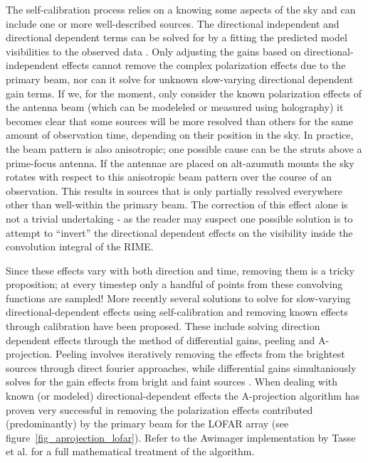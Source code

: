 The self-calibration process relies on a knowing some aspects of the sky and can include one or more well-described sources. The directional
independent and directional dependent terms can be solved for by a fitting the predicted model visibilities to the observed 
data \cite{noordam2010meqtrees}. Only adjusting the gains based on directional-independent effects cannot remove the complex 
polarization effects due to the primary beam, nor can it solve for unknown slow-varying directional dependent gain terms. If we, for 
the moment, only consider the known polarization effects of the antenna beam (which can be modeleled or measured using holography) it 
becomes clear that some sources will be more resolved than others for the same amount of observation time, 
depending on their position in the sky. In practice, the beam pattern is also anisotropic; one possible cause can be 
the struts above a prime-focus antenna. If the antennae are placed on alt-azumuth mounts the sky rotates with respect 
to this anisotropic beam pattern over the course of an observation. This results in sources that is only partially 
resolved everywhere other than well-within the primary beam. The correction of this effect alone is not a trivial undertaking - 
as the reader may suspect one possible solution is to attempt to ``invert'' the directional dependent effects on the visibility 
inside the convolution integral of the RIME.

Since these effects vary with both direction and time, removing them is a tricky proposition; at every timestep only a 
handful of points from these convolving functions are sampled! More recently several solutions to solve for slow-varying 
directional-dependent effects using self-calibration and removing known effects through calibration have been proposed. 
These include solving direction dependent effects through the method of differential gains, peeling and A-projection. Peeling 
involves iteratively removing the effects from the brightest sources through direct fourier approaches, while differential 
gains simultaniously solves for the gain effects from bright and faint sources \cite{2011A&A...527A.107S,2011A&A...527A.108S}. 
When dealing with known (or modeled) directional-dependent effects the A-projection algorithm \cite{bhatnagar2008correcting} has 
proven very successful in removing the polarization effects contributed (predominantly) by the primary beam for the 
LOFAR array (see figure~\ref{fig_aprojection_lofar}). Refer to the Awimager implementation by Tasse et 
al. \cite{tasse2013applying} for a full mathematical treatment of the algorithm.


